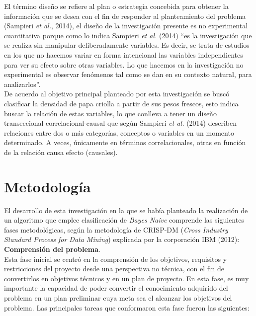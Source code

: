 El término diseño se refiere al plan o estrategia concebida para obtener la información que se desea con el fin de responder al
planteamiento del problema (Sampieri \textit{et al.}, 2014), el diseño de la investigación presente es no experimental cuantitativa porque como lo indica Sampieri \textit{et al.} (2014) “es la investigación que se realiza sin manipular deliberadamente variables. Es decir, se trata de estudios en los que no hacemos variar en forma intencional las variables independientes para ver su efecto sobre otras variables. Lo que hacemos en la investigación no experimental es observar fenómenos tal como se dan en su contexto natural, para analizarlos”.\\

De acuerdo al objetivo principal planteado por esta investigación se buscó clasificar la densidad de papa criolla a partir de sus pesos frescos, esto indica buscar la relación de estas variables, lo que conlleva a tener un diseño transeccional correlacional-causal que según Sampieri \textit{et al.} (2014) describen relaciones entre dos o más categorías, conceptos o variables en un momento determinado. A veces, únicamente en términos correlacionales, otras en función de la relación causa efecto (causales).


\section{Metodolog\'ia}

El desarrollo de esta investigación en la que se había planteado la realización de un algoritmo que emplee clasificación de \textit{Bayes Naive} comprende las siguientes fases metodológicas, según la metodología de CRISP-DM (\emph{Cross Industry Standard Process for Data Mining}) explicada por la corporación IBM (2012):\\

\noindent
\textbf{Comprensión del problema}.\\

	Esta fase inicial se centró en la comprensión de los objetivos, requisitos y restricciones del proyecto desde una perspectiva no técnica, con el fin de convertirlos en objetivos técnicos y en un plan de proyecto. En esta fase, es muy importante la capacidad de poder convertir el conocimiento adquirido del problema en un plan preliminar cuya meta sea el alcanzar los objetivos del problema. Las principales tareas que conformaron esta fase fueron las siguientes:\\

